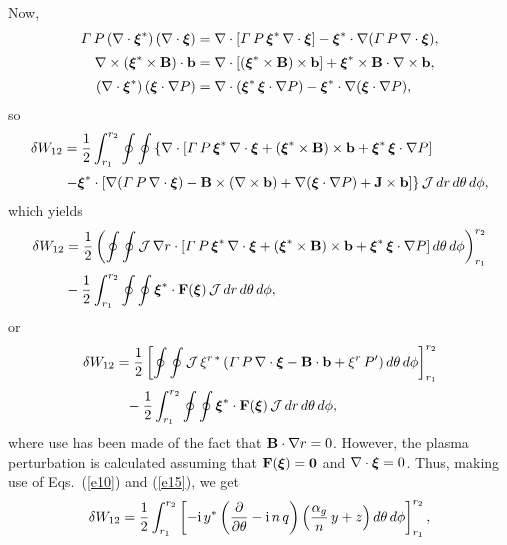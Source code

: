 \documentclass[12pt,prb,aps,notitlepage]{revtex4-1}
\newcommand{\bxi}{\mbox{\boldmath$\xi$}}
\begin{document}
Now,
\begin{align}
{\mit\Gamma}\,P\,(\nabla\cdot\bxi^\ast)\,(\nabla\cdot\bxi)&=\nabla\cdot[{\mit\Gamma}\,P\,\bxi^\ast\,\nabla\cdot\bxi]-\bxi^\ast\cdot\nabla(
{\mit\Gamma}\,P\,\nabla\cdot\bxi),\\[0.5ex]
 \nabla\times (\bxi^\ast\times {\bf B})\cdot {\bf b}&= \nabla\cdot[(\bxi^\ast\times {\bf B})\times {\bf b}] + \bxi^\ast\times {\bf B}\cdot\nabla\times {\bf b},\\[0.5ex]
 (\nabla\cdot\bxi^\ast)\,(\bxi\cdot\nabla P)&=\nabla\cdot(\bxi^\ast\,\bxi\cdot\nabla P) -\bxi^\ast\cdot\nabla(\bxi\cdot\nabla P),
\end{align}
so
\begin{align}
\delta W_{12} &= \frac{1}{2}\int_{r_1}^{r_2}\oint\oint\left\{\nabla\cdot[{\mit\Gamma}\,P\,\bxi^\ast\,\nabla\cdot\bxi+ (\bxi^\ast\times {\bf B})\times {\bf b}+\bxi^\ast\,\bxi\cdot\nabla P]\right.\nonumber\\[0.5ex]&\left.-\bxi^\ast\cdot[ \nabla({\mit\Gamma}\,P\,\nabla\cdot\bxi) - {\bf B}\times(\nabla\times {\bf b})+\nabla(\bxi\cdot\nabla P)+{\bf J}\times  {\bf b}]\right\}{\cal J}\,dr\,d\theta\,d\phi,
\end{align}
which yields
\begin{align}
\delta W_{12} &= \frac{1}{2}\left(\oint\oint{\cal J}\,\nabla r\cdot[{\mit\Gamma}\,P\,\bxi^\ast\,\nabla\cdot\bxi+ (\bxi^\ast\times {\bf B})\times {\bf b}+\bxi^\ast\,\bxi\cdot\nabla P]\,d\theta\,d\phi\right)_{r_1}^{r_2}\nonumber\\[0.5ex]
&-\frac{1}{2}\int_{r_1}^{r_2}\oint\oint \bxi^\ast\cdot{\bf F}(\bxi)\,{\cal J}\,dr\,d\theta\,d\phi,
\end{align}
or
\begin{align}
\delta W_{12} &= \frac{1}{2}\left[\oint\oint{\cal J}\,\xi^{r\,\ast}\,({\mit\Gamma}\,P\,\nabla\cdot\bxi -{\bf B}\cdot{\bf b} + \xi^r\,P')\,d\theta\,d\phi\right]_{r_1}^{r_2}\nonumber\\[0.5ex]&\phantom{=}-\frac{1}{2}\int_{r_1}^{r_2}\oint\oint\bxi^\ast\cdot{\bf F}(\bxi)\,{\cal J}\,dr\,d\theta\,d\phi,
\end{align}
where use has been made of the fact that ${\bf B}\cdot\nabla r = 0$.  However, the plasma perturbation is calculated assuming that ${\bf F}(\bxi)={\bf 0}$ and
$\nabla\cdot\bxi=0$.   Thus, making use of Eqs.~(\ref{e10}) and (\ref{e15}), we get
\begin{equation}
\delta W_{12} = \frac{1}{2}\int_{r_1}^{r_2}\left[-{\rm i}\,y^\ast\left(\frac{\partial}{\partial\theta}-{\rm i}\,n\,q\right)\left(\frac{\alpha_g}{n}\,y+z\right)d\theta\,d\phi\right]_{r_1}^{r_2},
\end{equation}
\end{document}
